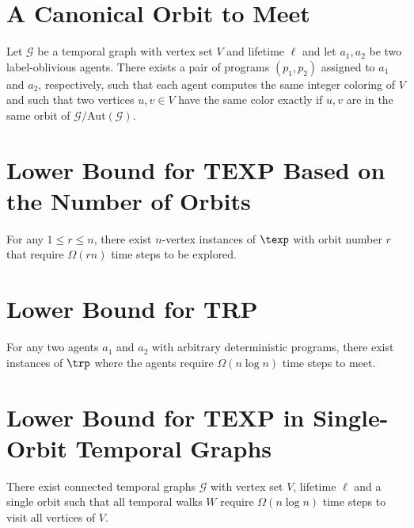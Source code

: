 {\section{A Canonical Orbit to Meet}
\begin{lemma}\label{lem:meeting} Let $\mathcal{G}$ be a temporal graph with
    vertex set $V$ and lifetime $\ell$ and let $a_1, a_2$ be two label-oblivious
    agents. There exists a pair of programs $(p_1, p_2)$ assigned to $a_1$ and
    $a_2$, respectively, such that each agent computes the same integer coloring
    of $V$ and such that two vertices $u, v \in V$ have the same color exactly
    if $u, v$ are in the same orbit of $\mathcal{G}/{\text{Aut}(\mathcal{G})}$.
\end{lemma}
\proofmeeting

\setcounter{theorem}{14}
\section{Lower Bound for TEXP Based on the Number of Orbits}
\begin{lemma}
        For any $1\le r\le n$, there exist $n$-vertex instances of $\texp$ with
        orbit number $r$ that require $\Omega(rn)$ time steps to be explored. 
    \end{lemma}
\proornlowerbound

\section{Lower Bound for TRP}
\begin{theorem}
    For any two agents $a_1$ and $a_2$ with arbitrary deterministic programs,
    there exist instances of $\trp$ where the agents
    require $\Omega(n \log n)$ time steps to meet.
\end{theorem}
\proofrendezvouslb

\section{Lower Bound for TEXP in Single-Orbit Temporal Graphs}
\begin{corollary} There exist connected temporal graphs
    $\mathcal{G}$ with vertex set $V$, lifetime $\ell$ and a single orbit such
    that all temporal walks $W$ require $\Omega(n \log n)$ time steps to visit
    all vertices of $V$.
\end{corollary}
\proofexplorationlb
}


